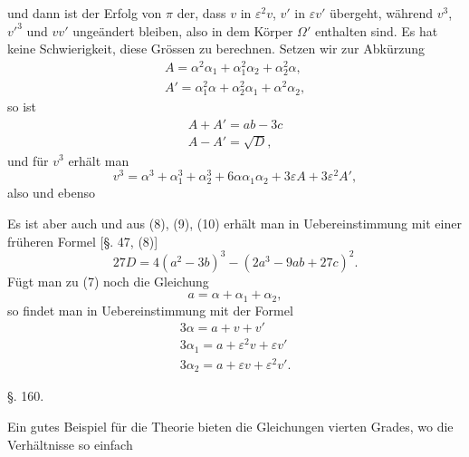 und
dann ist der Erfolg von $\pi$ der, dass $v$ in $\varepsilon^2 v$, $v'$ in $\varepsilon v'$ übergeht, während $v^3$, $v'^3$ und $vv'$ ungeändert bleiben, also in dem Körper $\Omega'$ enthalten sind. Es hat keine Schwierigkeit, diese Grössen zu berechnen. Setzen wir zur Abkürzung
\[
\begin{gathered}
A = \alpha^2\alpha_1 + \alpha_1^2\alpha_2 + \alpha_2^2\alpha, \\
A' = \alpha_1^2\alpha + \alpha_2^2\alpha_1 + \alpha^2\alpha_2,
\end{gathered}
\]
so ist
\[
\begin{gathered}
A + A' = ab - 3c \\
A - A' = \sqrt{D},
\end{gathered}
\]
und für $v^3$ erhält man
\[
v^3 = \alpha^3 + \alpha_1^3 + \alpha_2^3 + 6\alpha\alpha_1\alpha_2 + 3\varepsilon A + 3\varepsilon^2 A',
\]
also
und ebenso

Es ist aber auch
und aus (8), (9), (10) erhält man in Uebereinstimmung mit einer früheren Formel [§. 47, (8)]
\[
27D = 4(a^2 - 3b)^3 - (2a^3 - 9ab + 27c)^2.
\]
Fügt man zu (7) noch die Gleichung
\[
a = \alpha + \alpha_1 + \alpha_2,
\]
so findet man in Uebereinstimmung mit der  Formel
\[
\begin{gathered}
3\alpha = a + v + v' \\
3\alpha_1 = a + \varepsilon^2 v + \varepsilon v' \\
3\alpha_2 = a + \varepsilon v + \varepsilon^2 v'.
\end{gathered}
\]

\begin{center}
§. 160.

\end{center}

Ein gutes Beispiel für die  Theorie bieten die Gleichungen vierten Grades, wo die Verhältnisse so einfach
